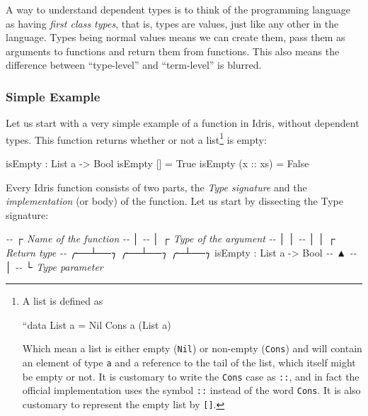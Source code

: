 \documentclass[
]{article}
\newenvironment{Shaded}{}{}
\newcommand{\CommentTok}[1]{\textcolor[rgb]{0.38,0.63,0.69}{\textit{#1}}}
\newcommand{\DataTypeTok}[1]{\textcolor[rgb]{0.56,0.13,0.00}{#1}}
\newcommand{\NormalTok}[1]{#1}
\newcommand{\OperatorTok}[1]{\textcolor[rgb]{0.40,0.40,0.40}{#1}}
\newcommand{\OtherTok}[1]{\textcolor[rgb]{0.00,0.44,0.13}{#1}}
\begin{document}
A way to understand dependent types is to think of the programming
language as having \emph{first class types}, that is, types are values,
just like any other in the language. Types being normal values means we
can create them, pass them as arguments to functions and return them
from functions. This also means the difference between ``type-level''
and ``term-level'' is blurred.

\hypertarget{simple-example}{%
\subsubsection{Simple Example}\label{simple-example}}

Let us start with a very simple example of a function in Idris, without
dependent types. This function returns whether or not a list\footnote{A
  list is defined as

  ``data List a = Nil \textbar{} Cons a (List a)

  Which mean a list is either empty (\texttt{Nil}) or non-empty
  (\texttt{Cons}) and will contain an element of type \texttt{a} and a
  reference to the tail of the list, which itself might be empty or not.
  It is customary to write the \texttt{Cons} case as \texttt{::}, and in
  fact the official implementation uses the symbol \texttt{::} instead
  of the word \texttt{Cons}. It is also customary to represent the empty
  list by \texttt{{[}{]}}.} is empty:

\begin{Shaded}
\begin{Highlighting}[]
\NormalTok{isEmpty }\OperatorTok{:} \DataTypeTok{List}\NormalTok{ a }\OtherTok{{-}\textgreater{}} \DataTypeTok{Bool}
\NormalTok{isEmpty [] }\OtherTok{=} \DataTypeTok{True}
\NormalTok{isEmpty (}\OtherTok{x ::}\NormalTok{ xs) }\OtherTok{=} \DataTypeTok{False}
\end{Highlighting}
\end{Shaded}

Every Idris function consists of two parts, the \emph{Type signature}
and the \emph{implementation} (or body) of the function. Let us start by
dissecting the Type signature:

\begin{Shaded}
\begin{Highlighting}[]
\CommentTok{{-}{-}    ┌ Name of the function}
\CommentTok{{-}{-}    │ }
\CommentTok{{-}{-}    │         ┌ Type of the argument }
\CommentTok{{-}{-}    │         │ }
\CommentTok{{-}{-}    │         │       ┌ Return type            }
\CommentTok{{-}{-} ╭──┴──╮   ╭──┴──╮  ╭─┴──╮}
\NormalTok{   isEmpty }\OperatorTok{:} \DataTypeTok{List}\NormalTok{ a }\OtherTok{{-}\textgreater{}} \DataTypeTok{Bool}
\CommentTok{{-}{-}                ▲}
\CommentTok{{-}{-}                │ }
\CommentTok{{-}{-}                └ Type parameter}
\end{Highlighting}
\end{Shaded}
\end{document}
